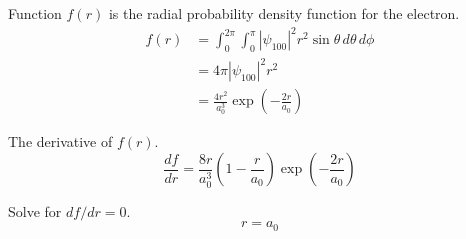 


\bigskip
Function $f(r)$ is the radial probability density function for the electron.
\begin{align*}
f(r)&=\int_0^{2\pi}\int_0^\pi|\psi_{100}|^2r^2\sin\theta\,d\theta\,d\phi
\\
&=4\pi|\psi_{100}|^2r^2
\\
&=\frac{4r^2}{a_0^3}\exp\left(-\frac{2r}{a_0}\right)\tag{1}
\end{align*}

The derivative of $f(r)$.
\begin{equation*}
\frac{df}{dr}=\frac{8r}{a_0^3}\left(1-\frac{r}{a_0}\right)\exp\left(-\frac{2r}{a_0}\right)\tag{2}
\end{equation*}

Solve for $df/dr=0$.
\begin{equation*}
r=a_0
\end{equation*}


